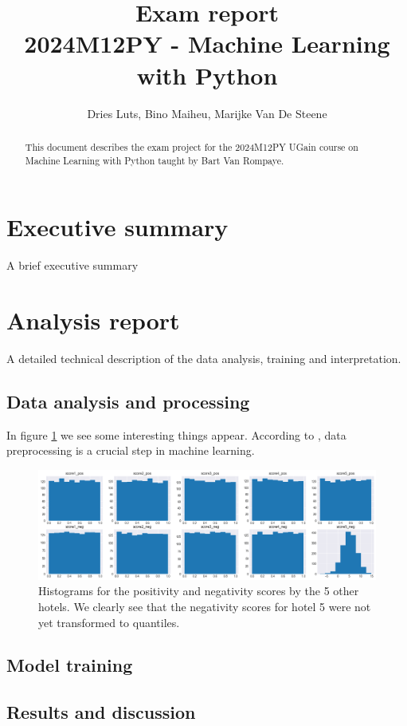 \documentclass[a4paper]{article}
\begin{document}
\title{Exam report\\2024M12PY - Machine Learning with Python}
\author{Dries Luts, Bino Maiheu, Marijke Van De Steene}
\maketitle

\begin{abstract}
    This document describes the exam project for the 2024M12PY UGain course on Machine Learning with Python taught by Bart Van Rompaye.
\end{abstract}


\section{Executive summary}

A brief executive summary

\section{Analysis report}

A detailed technical description of the data analysis, training and interpretation. 

\subsection{Data analysis and processing}

In figure \ref{fig:score_histograms} we see some interesting things appear. According to \citet{bishop2006pattern}, data preprocessing is a crucial step in machine learning.

\begin{figure}
    \centering
    \includegraphics[width=1.0\textwidth]{figs/score_histograms.png}
    \caption{Histograms for the positivity and negativity scores by the 5 other hotels. We clearly see
    that the negativity scores for hotel 5 were not yet transformed to quantiles.}
    \label{fig:score_histograms}
\end{figure}

\subsection{Model training}


\subsection{Results and discussion}




\end{document}

